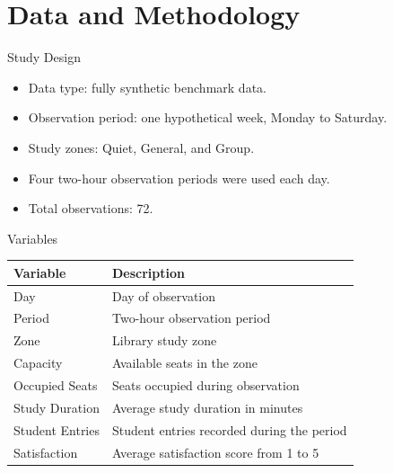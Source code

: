 \documentclass[aspectratio=169,11pt]{beamer}
\begin{document}
\section{Data and Methodology}

\begin{frame}{Study Design}
    \begin{itemize}
        \item Data type: fully synthetic benchmark data.
        \item Observation period: one hypothetical week, Monday to Saturday.
        \item Study zones: Quiet, General, and Group.
        \item Four two-hour observation periods were used each day.
        \item Total observations: 72.
    \end{itemize}
\end{frame}

\begin{frame}{Variables}
    \begin{table}
        \centering
        \small
        \begin{tabular}{ll}
            \toprule
            \textbf{Variable} & \textbf{Description} \\
            \midrule
            Day & Day of observation \\
            Period & Two-hour observation period \\
            Zone & Library study zone \\
            Capacity & Available seats in the zone \\
            Occupied Seats & Seats occupied during observation \\
            Study Duration & Average study duration in minutes \\
            Student Entries & Student entries recorded during the period \\
            Satisfaction & Average satisfaction score from 1 to 5 \\
            \bottomrule
        \end{tabular}
    \end{table}
\end{frame}
\end{document}

